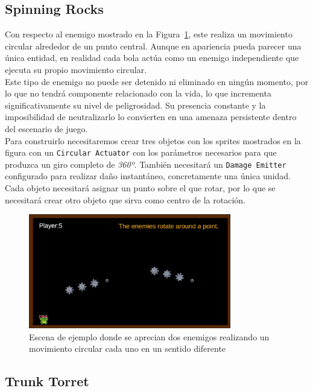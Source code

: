 \subsection{Spinning Rocks}

Con respecto al enemigo mostrado en la Figura~\ref{fig:SpinningRocks}, este realiza un movimiento circular alrededor de un punto central. Aunque en apariencia pueda parecer una única entidad, en realidad cada bola actúa como un enemigo independiente que ejecuta su propio movimiento circular.\\

Este tipo de enemigo no puede ser detenido ni eliminado en ningún momento, por lo que no tendrá componente relacionado con la vida, lo que incrementa significativamente su nivel de peligrosidad. Su presencia constante y la imposibilidad de neutralizarlo lo convierten en una amenaza persistente dentro del escenario de juego.\\

Para construirlo necesitaremos crear tres objetos con los sprites mostrados en la figura con un \texttt{Circular Actuator} con los parámetros necesarios para que produzca un giro completo de \textit{360º}. También necesitará un \texttt{Damage Emitter} configurado para realizar daño instantáneo, concretamente una única unidad.\\

Cada objeto necesitará asignar un punto sobre el que rotar, por lo que se necesitará crear otro objeto que sirva como centro de la rotación.\\

\begin{figure}[t]
	\centering
	\includegraphics[height=5cm]{Imagenes/SpinningRocks.png}
	\caption{Escena de ejemplo donde se aprecian dos enemigos realizando un movimiento circular cada uno en un sentido diferente}
	\label{fig:SpinningRocks}
\end{figure}

\subsection{Trunk Torret}

